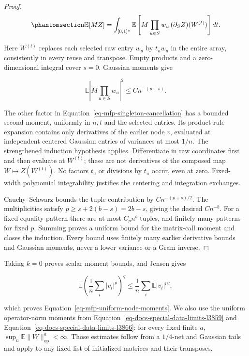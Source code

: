 \documentclass[
  11pt,
]{article}
\theoremstyle{definition}
\theoremstyle{plain}
\theoremstyle{plain}
\theoremstyle{plain}
\theoremstyle{remark}
\begin{document}
\begin{proof}
\begin{equation}\protect\phantomsection\label{eq-mfp-singleton-cancellation}{
\mathbb E[MZ]=\int_{[0,1]^s}
\mathbb E\left[M\prod_{u\in S}w_u\,
 (\partial_S Z)(W^{(t)})\right]dt.
}\end{equation}

Here \(W^{(t)}\) replaces each selected raw entry \(w_u\) by \(t_uw_u\)
in the entire array, consistently in every reuse and transpose. Empty
products and a zero-dimensional integral cover \(s=0\). Gaussian moments
give

\[
\mathbb E\left|M\prod_{u\in S}w_u\right|^2
\le C n^{-(p+s)}.
\]

The other factor in Equation~\ref{eq-mfp-singleton-cancellation} has a
bounded second moment, uniformly in \(n,t\) and the selected entries.
Its product-rule expansion contains only derivatives of the earlier node
\(v\), evaluated at independent centered Gaussian entries of variances
at most \(1/n\). The strengthened induction hypothesis applies.
Differentiate in raw coordinates first and then evaluate at \(W^{(t)}\);
these are not derivatives of the composed map \(W\mapsto Z(W^{(t)})\).
No factors \(t_u\) or divisions by \(t_u\) occur, even at zero.
Fixed-width polynomial integrability justifies the centering and
integration exchanges.

Cauchy--Schwarz bounds the tuple contribution by \(C n^{-(p+s)/2}\). The
multiplicities satisfy \(p\ge s+2(b-s)=2b-s\), giving the desired
\(C n^{-b}\). For a fixed equality pattern there are at most \(C_p n^b\)
tuples, and finitely many patterns for fixed \(p\). Summing proves a
uniform bound for the matrix-call moment and closes the induction. Every
bound uses finitely many earlier derivative bounds and Gaussian moments,
never a lower variance or a Gram inverse.
\end{proof}

Taking \(k=0\) proves scalar moment bounds, and Jensen gives

\[
\mathbb E\left(\frac1n\sum_i|v_i|^p\right)^q
\le\frac1n\sum_i\mathbb E|v_i|^{pq},
\]

which proves Equation~\ref{eq-mfp-uniform-node-moments}. We also use the
uniform operator-norm moments from
Equation~\ref{eq-docs-special-data-limits-l3859} and
Equation~\ref{eq-docs-special-data-limits-l3866}: for every fixed finite
\(a\), \(\sup_n\mathbb E\|W\|_{\mathrm{op}}^a<\infty\). Those estimates
follow from a \(1/4\)-net and Gaussian tails and apply to any fixed list
of initialized matrices and their transposes.
\end{document}
